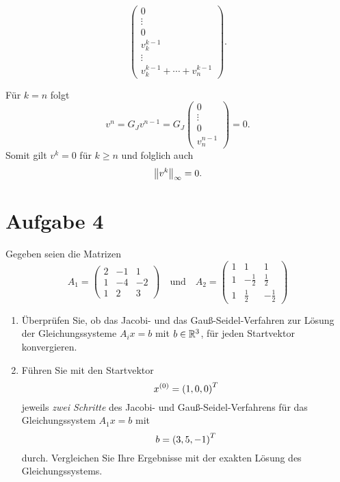 \documentclass{exercise}
\begin{document}
\begin{enumerate}
\begin{itemize}
\[\begin{pmatrix}
                    0\\
                    \vdots\\
                    0\\
                    v_k^{k - 1}\\
                    \vdots\\
                    v_k^{k - 1} + \cdots + v_n^{k - 1}
                \end{pmatrix}.
            \]
        \end{itemize}
        Für \(k = n\) folgt
        \[
            v^n = G_J v^{n - 1} = G_J \begin{pmatrix}
                0\\
                \vdots\\
                0\\
                v_n^{n - 1}
            \end{pmatrix} = 0.
        \]
        Somit gilt \(v^k = 0\) für \(k \ge n\) und folglich auch
        \[
            \norm*{v^k}_\infty = 0.
        \]
    \end{enumerate}
    
    
    \section*{Aufgabe 4}
    
    \begin{problem}
        Gegeben seien die Matrizen
        \[
            A_1 = \begin{pmatrix}
                2 & -1 & 1\\
                1 & -4 & -2\\
                1 & 2 & 3
            \end{pmatrix} \quad \text{und} \quad A_2 = \begin{pmatrix}
                1 & 1 & 1\\
                1 & -\frac{1}{2} & \frac{1}{2}\\
                1 & \frac{1}{2} & -\frac{1}{2}
            \end{pmatrix}
        \]
        \begin{enumerate}
            \item Überprüfen Sie, ob das Jacobi- und das Gauß-Seidel-Verfahren zur Lösung der Gleichungssysteme \(A_i x = b\) mit \(b \in \R^3\), für jeden Startvektor konvergieren.
            \item Führen Sie mit den Startvektor
            \[
                x^{\parentheses*{0}} = \parentheses*{1, 0, 0}^T
            \]
            jeweils \emph{zwei Schritte} des Jacobi- und Gauß-Seidel-Verfahrens für das Gleichungssystem \(A_1 x = b\) mit
            \[
                b = \parentheses*{3, 5, -1}^T
            \]
            durch.
            Vergleichen Sie Ihre Ergebnisse mit der exakten Lösung des Gleichungssystems.
        \end{enumerate}
    \end{problem}
    
\end{document}
